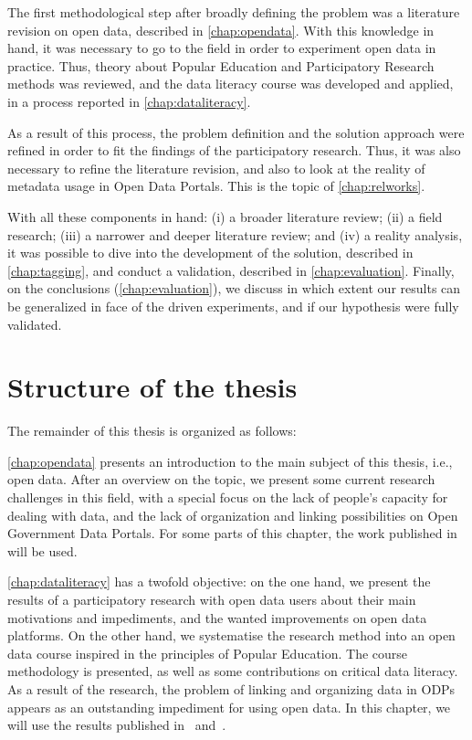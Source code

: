 {The first methodological step after broadly defining the problem was a literature revision on open data, described in \autoref{chap:opendata}.
With this knowledge in hand, it was necessary to go to the field in order to experiment open data in practice.
Thus, theory about Popular Education and Participatory Research methods was reviewed, and the data literacy course was developed and applied, in a process reported in \autoref{chap:dataliteracy}.

As a result of this process, the problem definition and the solution approach were refined in order to fit the findings of the participatory research.
Thus, it was also necessary to refine the literature revision, and also to look at the reality of metadata usage in Open Data Portals.
This is the topic of \autoref{chap:relworks}.

With all these components in hand: (i) a broader literature review; (ii) a field research; (iii) a narrower and deeper literature review; and (iv) a reality analysis, it was possible to dive into the development of the solution, described in \autoref{chap:tagging}, and conduct a validation, described in \autoref{chap:evaluation}.
Finally, on the conclusions (\autoref{chap:evaluation}), we discuss in which extent our results can be generalized in face of the driven experiments, and if our hypothesis were fully validated.

\section{Structure of the thesis}

The remainder of this thesis is organized as follows:

\autoref{chap:opendata} presents an introduction to the main subject of this thesis, i.e., open data.
After an overview on the topic, we present some current research challenges in this field, with a special focus on the lack of people's capacity for dealing with data, and the lack of organization and linking possibilities on Open Government Data Portals. 
For some parts of this chapter, the work published in~ will be used.

\autoref{chap:dataliteracy} has a twofold objective: on the one hand, we present the results of a participatory research with open data users about their main motivations and impediments, and the wanted improvements on open data platforms. 
On the other hand, we systematise the research method into an open data course inspired in the principles of Popular Education.
The course methodology is presented, as well as some contributions on critical data literacy.
As a result of the research, the problem of linking and organizing data in ODPs appears as an outstanding impediment for using open data.
In this chapter, we will use the results published in~ and~.

}
